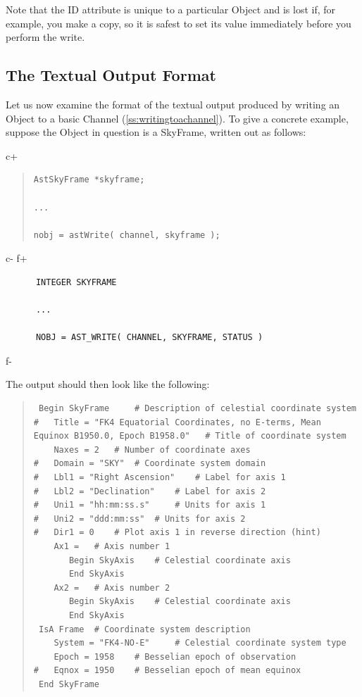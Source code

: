 \documentclass[twoside,11pt]{article}
\newcommand{\secref}[1]{\S\ref{#1}}
\renewcommand{\secref}[1]{\ref{#1}}
\begin{document}
Note that the ID attribute is unique to a particular Object and
is lost if, for example, you make a copy, so it is safest to set its
value immediately before you perform the write.

\subsection{\label{ss:textualoutputformat}The Textual Output Format} 

Let us now examine the format of the textual output produced by
writing an Object to a basic Channel
(\secref{ss:writingtoachannel}). To give a concrete example, suppose
the Object in question is a SkyFrame, written out as follows:

c+
\begin{quote}
\small
\begin{verbatim}
AstSkyFrame *skyframe;

...

nobj = astWrite( channel, skyframe );
\end{verbatim}
\normalsize
\end{quote}
c-
f+
\small
\begin{verbatim}
      INTEGER SKYFRAME

      ...

      NOBJ = AST_WRITE( CHANNEL, SKYFRAME, STATUS )
\end{verbatim}
\normalsize
f-

The output should then look like the following:

\begin{quote}
\small
\begin{verbatim}
 Begin SkyFrame 	# Description of celestial coordinate system
#   Title = "FK4 Equatorial Coordinates, no E-terms, Mean Equinox B1950.0, Epoch B1958.0" 	# Title of coordinate system
    Naxes = 2 	# Number of coordinate axes
#   Domain = "SKY" 	# Coordinate system domain
#   Lbl1 = "Right Ascension" 	# Label for axis 1
#   Lbl2 = "Declination" 	# Label for axis 2
#   Uni1 = "hh:mm:ss.s" 	# Units for axis 1
#   Uni2 = "ddd:mm:ss" 	# Units for axis 2
#   Dir1 = 0 	# Plot axis 1 in reverse direction (hint)
    Ax1 = 	# Axis number 1
       Begin SkyAxis 	# Celestial coordinate axis
       End SkyAxis
    Ax2 = 	# Axis number 2
       Begin SkyAxis 	# Celestial coordinate axis
       End SkyAxis
 IsA Frame 	# Coordinate system description
    System = "FK4-NO-E" 	# Celestial coordinate system type
    Epoch = 1958 	# Besselian epoch of observation
#   Eqnox = 1950 	# Besselian epoch of mean equinox
 End SkyFrame
\end{verbatim}
\normalsize
\end{quote}
\end{document}

